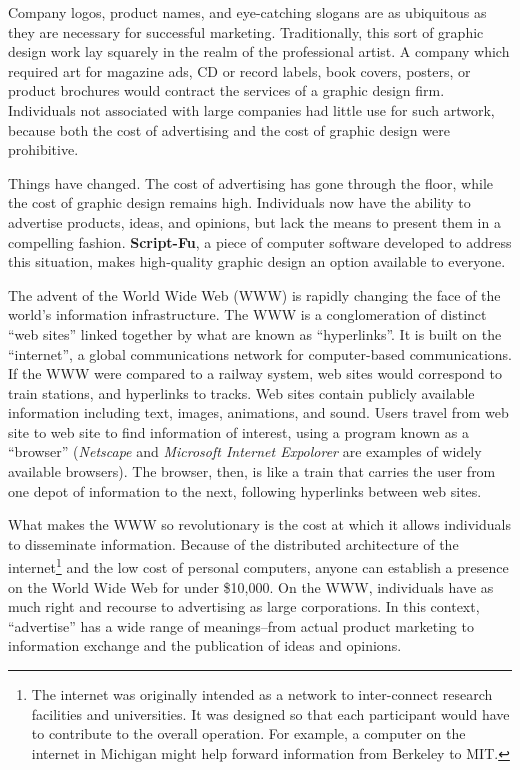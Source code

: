 \documentclass{article}
\begin{document}
Company logos, product names, and eye-catching slogans are as
ubiquitous as they are necessary for successful marketing.
Traditionally, this sort of graphic design work lay squarely in the
realm of the professional artist.  A company which required art for
magazine ads, CD or record labels, book covers, posters, or product
brochures would contract the services of a graphic design firm.
Individuals not associated with large companies had little use for
such artwork, because both the cost of advertising and the cost of
graphic design were prohibitive.

Things have changed.  The cost of advertising has gone through the
floor, while the cost of graphic design remains high.  Individuals now
have the ability to advertise products, ideas, and opinions, but lack
the means to present them in a compelling fashion.  {\bf Script-Fu}, a
piece of computer software developed to address this situation, makes
high-quality graphic design an option available to everyone.

The advent of the World Wide Web (WWW) is rapidly changing the face of
the world's information infrastructure.  The WWW is a conglomeration
of distinct ``web sites'' linked together by what are known as
``hyperlinks''.  It is built on the ``internet'', a global
communications network for computer-based communications.  If the WWW
were compared to a railway system, web sites would correspond to train
stations, and hyperlinks to tracks.  Web sites contain publicly
available information including text, images, animations, and sound.
Users travel from web site to web site to find information of
interest, using a program known as a ``browser'' ({\it Netscape} and
{\it Microsoft Internet Expolorer} are examples of widely available
browsers).  The browser, then, is like a train that carries the user
from one depot of information to the next, following hyperlinks
between web sites.

What makes the WWW so revolutionary is the cost at which it allows
individuals to disseminate information.  Because of the distributed
architecture of the internet\footnote{The internet was originally
intended as a network to inter-connect research facilities and
universities. It was designed so that each participant would have to
contribute to the overall operation.  For example, a computer on the
internet in Michigan might help forward information from Berkeley to
MIT.} and the low cost of personal computers, anyone can establish a
presence on the World Wide Web for under \$10,000.  On the WWW,
individuals have as much right and recourse to advertising as large
corporations.  In this context, ``advertise'' has a wide range of
meanings--from actual product marketing to information exchange and
the publication of ideas and opinions.
\end{document}
